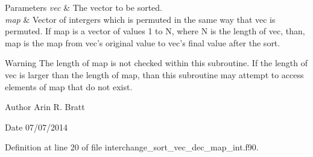 \begin{DoxyParams}{Parameters}
{\em vec} & The vector to be sorted.\\
\hline
{\em map} & Vector of intergers which is permuted in the same way that vec is permuted. If map is a vector of values 1 to N, where N is the length of vec, than, map is the map from vec's original value to vec's final value after the sort.\\
\hline
\end{DoxyParams}
\begin{DoxyWarning}{Warning}
The length of map is not checked within this subroutine. If the length of vec is larger than the length of map, than this subroutine may attempt to access elements of map that do not exist.
\end{DoxyWarning}
\begin{DoxyAuthor}{Author}
Arin R. Bratt 
\end{DoxyAuthor}
\begin{DoxyDate}{Date}
07/07/2014 
\end{DoxyDate}


Definition at line 20 of file interchange\-\_\-sort\-\_\-vec\-\_\-dec\-\_\-map\-\_\-int.\-f90.

